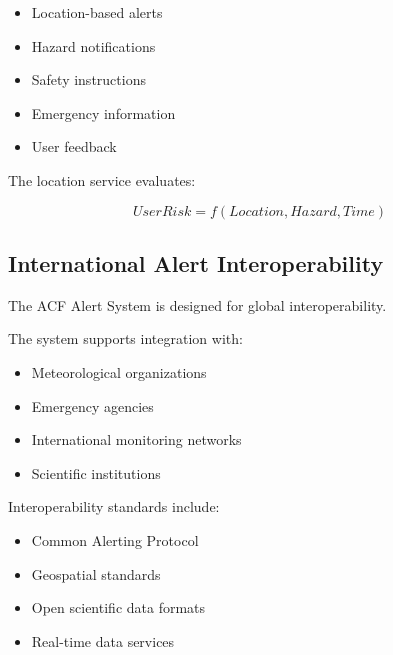 \begin{itemize}

\item Location-based alerts

\item Hazard notifications

\item Safety instructions

\item Emergency information

\item User feedback

\end{itemize}


The location service evaluates:

\[
UserRisk=
f(Location,Hazard,Time)
\]



\subsection{International Alert Interoperability}

The ACF Alert System is designed for global interoperability.

The system supports integration with:

\begin{itemize}

\item Meteorological organizations

\item Emergency agencies

\item International monitoring networks

\item Scientific institutions

\end{itemize}


Interoperability standards include:

\begin{itemize}

\item Common Alerting Protocol

\item Geospatial standards

\item Open scientific data formats

\item Real-time data services

\end{itemize}



